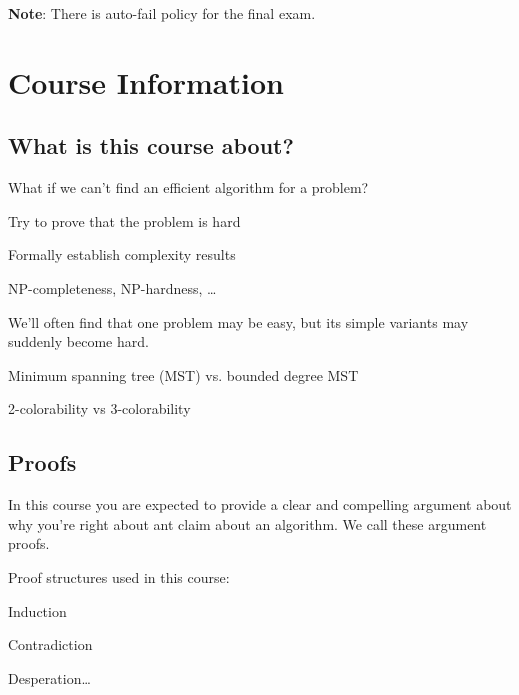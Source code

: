 \textbf{Note}: There is  auto-fail policy for the final exam.

\section{Course Information}

\subsection{What is this course about?}

\begin{listu}
    \item What if we can't find an efficient algorithm for a problem?

    \begin{listu}
        \item Try to prove that the problem is hard 
        \item Formally establish complexity results 
        \item NP-completeness, NP-hardness, \dots
    \end{listu}
    
    \item We'll often find that one problem may be easy, but its simple variants may suddenly become hard. 
    
    \begin{listu}
        \item Minimum spanning tree (MST) vs. bounded degree MST
        \item 2-colorability vs 3-colorability
    \end{listu}
\end{listu}

\subsection{Proofs}

In this course you are expected to provide a clear and compelling argument about why you're right about ant claim about an algorithm. We call these argument proofs. 

Proof structures used in this course:
\begin{listu}
    \item Induction 
    \item Contradiction
    \item Desperation\dots
\end{listu}

